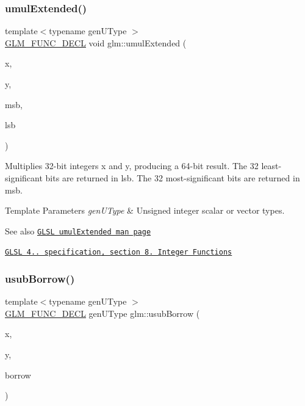 \subsubsection{\texorpdfstring{umul\+Extended()}{umulExtended()}}
{\footnotesize\ttfamily template$<$typename gen\+U\+Type $>$ \\
\hyperlink{setup_8hpp_ab2d052de21a70539923e9bcbf6e83a51}{G\+L\+M\+\_\+\+F\+U\+N\+C\+\_\+\+D\+E\+CL} void glm\+::umul\+Extended (\begin{DoxyParamCaption}\item[{gen\+U\+Type const \&}]{x,  }\item[{gen\+U\+Type const \&}]{y,  }\item[{gen\+U\+Type \&}]{msb,  }\item[{gen\+U\+Type \&}]{lsb }\end{DoxyParamCaption})}

Multiplies 32-\/bit integers x and y, producing a 64-\/bit result. The 32 least-\/significant bits are returned in lsb. The 32 most-\/significant bits are returned in msb.


\begin{DoxyTemplParams}{Template Parameters}
{\em gen\+U\+Type} & Unsigned integer scalar or vector types.\\
\hline
\end{DoxyTemplParams}
\begin{DoxySeeAlso}{See also}
\href{http://www.opengl.org/sdk/docs/manglsl/xhtml/umulExtended.xml}{\tt G\+L\+SL umul\+Extended man page} 

\href{http://www.opengl.org/registry/doc/GLSLangSpec.4.20.8.pdf}{\tt G\+L\+SL 4.. specification, section 8. Integer Functions} 
\end{DoxySeeAlso}
\mbox{\label{group__core__func__integer_gae5b4a6cefd1e21fd2e1b8526b4c964a7}} 
\subsubsection{\texorpdfstring{usub\+Borrow()}{usubBorrow()}}
{\footnotesize\ttfamily template$<$typename gen\+U\+Type $>$ \\
\hyperlink{setup_8hpp_ab2d052de21a70539923e9bcbf6e83a51}{G\+L\+M\+\_\+\+F\+U\+N\+C\+\_\+\+D\+E\+CL} gen\+U\+Type glm\+::usub\+Borrow (\begin{DoxyParamCaption}\item[{gen\+U\+Type const \&}]{x,  }\item[{gen\+U\+Type const \&}]{y,  }\item[{gen\+U\+Type \&}]{borrow }\end{DoxyParamCaption})}

